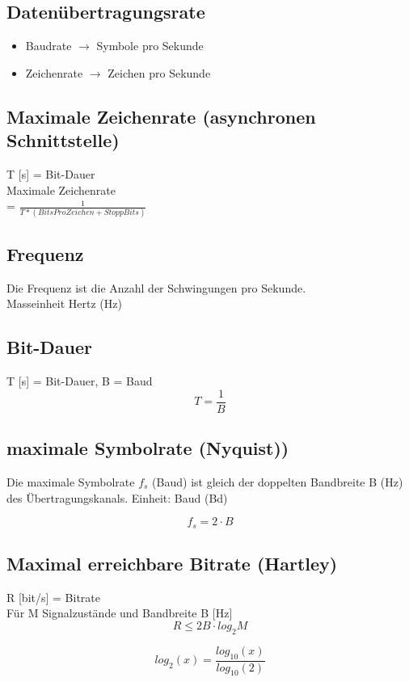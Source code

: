 \subsection{Datenübertragungsrate}{
    \begin{itemize}[noitemsep]
        \item Baudrate $\to$ Symbole pro Sekunde
        \item Zeichenrate $\to$ Zeichen pro Sekunde
    \end{itemize}

}
\subsection{Maximale Zeichenrate (asynchronen Schnittstelle)}{
    T [s] = Bit-Dauer \\
    Maximale Zeichenrate \\ = \LARGE $\frac{1}{T*(BitsProZeichen + StoppBits)} $
}



\subsection{Frequenz}{
    {Die Frequenz ist die Anzahl der Schwingungen pro Sekunde.\\
            Masseinheit Hertz (Hz)\\}
}

\subsection{Bit-Dauer }
{  T [s] = Bit-Dauer, B = Baud \\}
$$ T = \frac{1}{B}$$


\subsection{maximale Symbolrate (Nyquist))}
{    Die maximale Symbolrate $f_s$ (Baud) ist gleich der doppelten Bandbreite B (Hz) des
    Übertragungskanals.
}
{Einheit: Baud (Bd)}


$$ f_s = 2 \cdot B$$

\subsection{Maximal erreichbare Bitrate (Hartley)}{
R [bit/s] = Bitrate \\ {Für M Signalzustände und Bandbreite B [Hz]}  \\
$$ R \leq 2B \cdot log_2{M} $$

$$ log_2(x) = \frac{log_{10}(x)}{log_{10}(2)} $$
}



